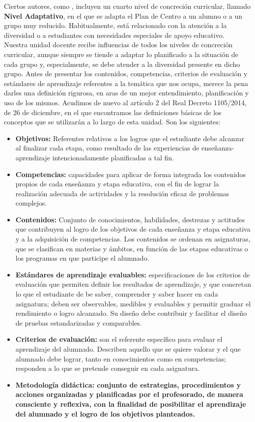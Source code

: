 \documentclass[../main.tex]{book}
\begin{document}
Ciertos autores, como \cite{cabrerizo2007}, incluyen un cuarto nivel de concreción curricular, llamado \textbf{Nivel Adaptativo}, en el que se adapta el Plan de Centro a un alumno o a un grupo muy reducido. Habitualmente, está relacionado con la atención a la diversidad o a estudiantes con necesidades especiales de apoyo educativo. \\

Nuestra unidad docente recibe influencias de todos los niveles de concreción curricular, aunque siempre se tiende a adaptar lo planificado a la situación de cada grupo y, especialmente, se debe atender a la diversidad presente en dicho grupo. Antes de presentar los contenidos, competencias, criterios de evaluación y estándares de aprendizaje referentes a la temática que nos ocupa, merece la pena darles una definición rigurosa, en aras de un mejor entendimiento, planificación y uso de los mismos. Acudimos de nuevo al artículo 2 del Real Decreto 1105/2014, de 26 de diciembre, en el que encontramos las definiciones básicas de los conceptos que se utilizarán a lo largo de esta unidad. Son los siguientes:

\begin{itemize}
	\item \textbf{Objetivos: } Referentes relativos a los logros que el estudiante debe alcanzar al finalizar cada etapa, como resultado de las experiencias de enseñanza-aprendizaje intencionadamente planificadas a tal fin.
	\item \textbf{Competencias: } capacidades para aplicar de forma integrada los contenidos propios de cada enseñanza y etapa educativa, con el fin de lograr la realización adecuada de actividades y la resolución eficaz de problemas complejos.
	\item \textbf{Contenidos: } Conjunto de conocimientos, habilidades, destrezas y actitudes que contribuyen al logro de los objetivos de cada enseñanza y etapa educativa y  a la adquisición de competencias. Los contenidos se ordenan en asignaturas, que se clasifican en materias y ámbitos, en función de las etapas educativas o los programas en que participe el alumnado.
	\item \textbf{Estándares de aprendizaje evaluables: } especificaciones de los criterios de evaluación que permiten definir los resultados de aprendizaje, y que concretan lo que el estudiante de be saber, comprender y saber hacer en cada asignatura; deben ser observables, medibles y evaluables y permitir graduar el rendimiento o logro alcanzado. Su diseño debe contribuir y facilitar el diseño de pruebas estandarizadas y comparables.
	\item \textbf{Criterios de evaluación: } son el referente específico para evaluar el aprendizaje del alumnado. Describen aquello que se quiere valorar y el que alumnado debe lograr, tanto en conocimientos como en competencias; responden a lo que se pretende conseguir en cada asignatura.
	\item \textbf{Metodología didáctica: conjunto de estrategias, procedimientos y acciones organizadas y planificadas por el profesorado, de manera consciente y reflexiva, con la finalidad de posibilitar el aprendizaje del alumnado y el logro de los objetivos planteados.}
\end{itemize} 
\end{document}
